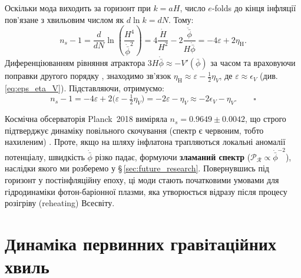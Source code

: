 \begin{mathbox}[title={Виведення співвідношення~$n_s$}]
Оскільки мода виходить за горизонт при $k = aH$, число $e$-folds до кінця інфляції пов'язане з хвильовим числом як $d\ln k = dN$. Тому:
\begin{equation*}
  n_s - 1 = \frac{d}{dN}\ln\! \left(\frac{H^4}{\dot{\bar\phi}^2}\right) = 4\frac{\dot H}{H^2} - 2\frac{\ddot{\bar\phi}}{H\dot{\bar\phi}} = -4\varepsilon + 2\eta_\mathrm{H}.
\end{equation*}
Диференціюванням рівняння атрактора $3H\dot{\bar\phi} \approx -V'(\bar\phi)$ за часом та враховуючи поправки другого порядку \cite{mukhanov_2005}, знаходимо зв'язок $\eta_\mathrm{H} \approx \varepsilon - \tfrac{1}{2}\eta_V$, де $\varepsilon \approx \epsilon_V$ (див. \eqref{eq:eps_eta_V}). Підставляючи, отримуємо:
\begin{equation*}
  n_s - 1 = -4\varepsilon + 2\bigl(\varepsilon - \tfrac{1}{2}\eta_V\bigr) = -2\varepsilon - \eta_V \approx -2\epsilon_V - \eta_V. \qquad\square
\end{equation*}
\end{mathbox}

Космічна обсерваторія Planck~2018 виміряла $n_s = 0.9649 \pm 0.0042$, що строго підтверджує динаміку повільного скочування (спектр є червоним, тобто нахиленим) \cite{planck_2018}. Проте, якщо на шляху інфлатона трапляються локальні аномалії потенціалу, швидкість $\dot{\bar\phi}$ різко падає, формуючи \textbf{зламаний спектр} ($\mathcal{P}_{\mathcal{R}} \propto \dot{\bar\phi}^{-2}$), наслідки якого ми розберемо у §\,\ref{sec:future_research}. Повернувшись під горизонт у постінфляційну епоху, ці моди стають початковими умовами для гідродинаміки фотон-баріонної плазми, яка утворюється відразу після процесу розігріву (reheating) Всесвіту.

\section{Динаміка первинних гравітаційних хвиль}


